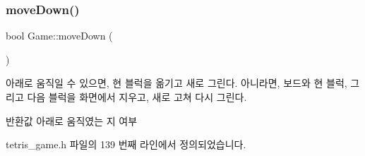 \subsubsection{\texorpdfstring{move\+Down()}{moveDown()}}
{\footnotesize\ttfamily bool Game\+::move\+Down (\begin{DoxyParamCaption}{ }\end{DoxyParamCaption})\hspace{0.3cm}{\ttfamily [inline]}}

아래로 움직일 수 있으면, 현 블럭을 옮기고 새로 그린다. 아니라면, 보드와 현 블럭, 그리고 다음 블럭을 화면에서 지우고, 새로 고쳐 다시 그린다. \begin{DoxyReturn}{반환값}
아래로 움직였는 지 여부 
\end{DoxyReturn}


tetris\+\_\+game.\+h 파일의 139 번째 라인에서 정의되었습니다.


